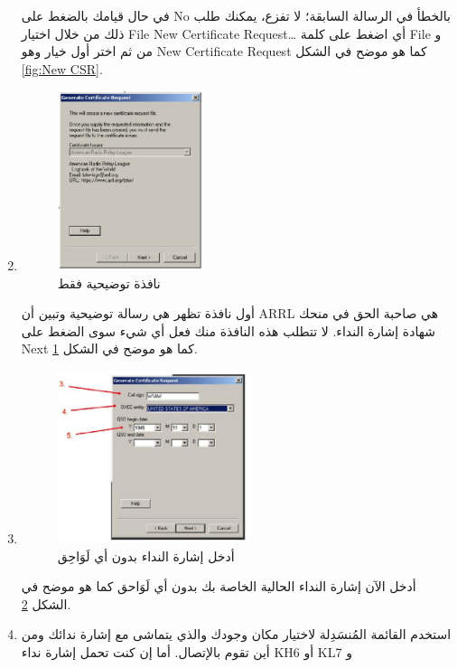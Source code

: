 \documentclass[a4paper,12pt]{article}
\begin{document}
\begin{enumerate}
		في حال قيامك بالضغط على No بالخطأ في الرسالة السابقة؛ لا تفزع، يمكنك طلب ذلك من
		خلال اختيار \textenglish{File \textbar  New Certificate Request\ldots}  أي اضغط على
كلمة \textenglish{File} و من ثم اختر أول خيار وهو \textenglish{New Certificate Request} كما هو موضح في الشكل \ref{fig:New CSR}.
  \clearpage  
	\item
		\begin{figure}[!hbtp]
		\centering
		\includegraphics[width=0.4\textwidth]{generatecsr.eps}
		\caption{نافذة توضيحية فقط}
		\label{fig:ARRL Issuer}
		\end{figure}
		  أول نافذة تظهر هي رسالة توضيحية وتبين أن \textenglish{ARRL} هي صاحبة الحق في منحك شهادة
		  إشارة النداء. لا تتطلب هذه النافذة منك فعل أي شيء سوى الضغط على \textenglish{Next} كما هو موضح في الشكل \ref{fig:ARRL Issuer}.
	\item
		\begin{figure}[!hbtp]
		\centering
		\includegraphics[width=0.53\textwidth]{callsign.eps}
		\caption{أدخل إشارة النداء بدون أي لَوَاحِق}
		\label{fig:Callsign}
		\end{figure}
		  أدخل الآن إشارة النداء الحالية الخاصة بك بدون أي لَوَاحق كما هو موضح في الشكل \ref{fig:Callsign}.
	\item 
		استخدم القائمة المُنسَدِلة لاختيار مكان وجودك والذي يتماشى مع إشارة ندائك ومن أين تقوم بالإتصال. أما إن كنت تحمل إشارة نداء \textenglish{KH6} أو \textenglish{KL7} و


\end{enumerate}
\end{document}
